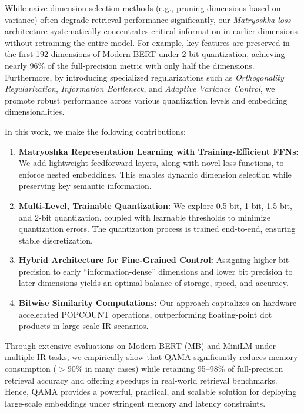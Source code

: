 While naive dimension selection methods (e.g., pruning dimensions based on variance) often degrade retrieval performance significantly, our \emph{Matryoshka loss} architecture systematically concentrates critical information in earlier dimensions without retraining the entire model. For example, key features are preserved in the first 192 dimensions of Modern BERT under 2-bit quantization, achieving nearly 96\% of the full-precision metric with only half the dimensions. Furthermore, by introducing specialized regularizations such as \emph{Orthogonality Regularization}, \emph{Information Bottleneck}, and \emph{Adaptive Variance Control}, we promote robust performance across various quantization levels and embedding dimensionalities.

In this work, we make the following contributions:
\begin{enumerate}
    \item \textbf{Matryoshka Representation Learning with Training-Efficient FFNs:} We add lightweight feedforward layers, along with novel loss functions, to enforce nested embeddings. This enables dynamic dimension selection while preserving key semantic information.
    \item \textbf{Multi-Level, Trainable Quantization:} We explore 0.5-bit, 1-bit, 1.5-bit, and 2-bit quantization, coupled with learnable thresholds to minimize quantization errors. The quantization process is trained end-to-end, ensuring stable discretization.
    \item \textbf{Hybrid Architecture for Fine-Grained Control:} Assigning higher bit precision to early “information-dense” dimensions and lower bit precision to later dimensions yields an optimal balance of storage, speed, and accuracy.
    \item \textbf{Bitwise Similarity Computations:} Our approach capitalizes on hardware-accelerated POPCOUNT operations, outperforming floating-point dot products in large-scale IR scenarios.
\end{enumerate}

Through extensive evaluations on Modern BERT (MB) and MiniLM under multiple IR tasks, we empirically show that QAMA significantly reduces memory consumption (\(>90\%\) in many cases) while retaining 95--98\% of full-precision retrieval accuracy and offering speedups in real-world retrieval benchmarks. Hence, QAMA provides a powerful, practical, and scalable solution for deploying large-scale embeddings under stringent memory and latency constraints.

